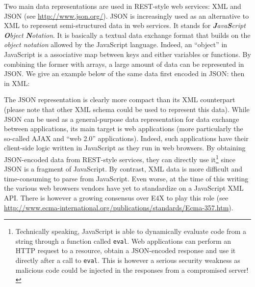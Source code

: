 Two main data representations are used in REST-style web services: XML and JSON (see \url{http://www.json.org/}). JSON is increasingly used as an alternative to XML to represent semi-structured data in web services. It stands for \emph{\textbf{J}ava\textbf{S}cript \textbf{O}bject \textbf{N}otation}. It is basically a textual data exchange format that builds on the \emph{object notation} allowed by the JavaScript language. Indeed, an ``object'' in JavaScript is a associative map between keys and either variables or functions. By combining the former with arrays, a large amount of data can be represented in JSON. We give an example below of the same data first encoded in JSON:
{\footnotesize }
then in XML:
{\footnotesize }\

The JSON representation is clearly more compact than its XML counterpart (please note that other XML schema could be used to represent this data). While JSON can be used as a general-purpose data representation for data exchange between applications, its main target is web applications (more particularly the so-called AJAX and ``web 2.0'' applications). Indeed, such applications have their client-side logic written in JavaScript as they run in web browsers. By obtaining JSON-encoded data from REST-style services, they can directly use it\footnote{Technically speaking, JavaScript is able to dynamically evaluate code from a string through a function called \texttt{eval}. Web applications can perform an HTTP request to a resource, obtain a JSON-encoded response and use it directly after a call to \texttt{eval}. This is however a serious security weakness as malicious code could be injected in the responses from a compromised server!} since JSON is a fragment of JavaScript. By contrast, XML data is more difficult and time-consuming to parse from JavaScript. Even worse, at the time of this writing the various web browsers vendors have yet to standardize on a JavaScript XML API. There is however a growing consensus over E4X to play this role (see \url{http://www.ecma-international.org/publications/standards/Ecma-357.htm}).\\

